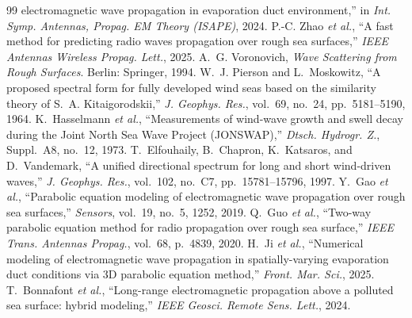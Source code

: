 \documentclass[11pt,a4paper]{article}
\begin{document}
\begin{thebibliography}{99}
  electromagnetic wave propagation in evaporation duct environment,'' in
  \emph{Int. Symp. Antennas, Propag. EM Theory (ISAPE)}, 2024.
 P.-C. Zhao \emph{et al.}, ``A fast method for predicting radio
  waves propagation over rough sea surfaces,'' \emph{IEEE Antennas Wireless Propag.
  Lett.}, 2025.
 A.~G. Voronovich, \emph{Wave Scattering from Rough
  Surfaces}. Berlin: Springer, 1994.
 W.~J. Pierson and L.~Moskowitz, ``A proposed spectral form for fully
  developed wind seas based on the similarity theory of S.~A. Kitaigorodskii,''
  \emph{J. Geophys. Res.}, vol.~69, no.~24, pp.~5181--5190, 1964.
 K.~Hasselmann \emph{et al.}, ``Measurements of wind-wave
  growth and swell decay during the Joint North Sea Wave Project (JONSWAP),''
  \emph{Dtsch. Hydrogr. Z.}, Suppl.~A8, no.~12, 1973.
 T.~Elfouhaily, B.~Chapron, K.~Katsaros, and
  D.~Vandemark, ``A unified directional spectrum for long and short wind-driven
  waves,'' \emph{J. Geophys. Res.}, vol.~102, no.~C7, pp.~15781--15796, 1997.
 Y.~Gao \emph{et al.}, ``Parabolic equation modeling of
  electromagnetic wave propagation over rough sea surfaces,'' \emph{Sensors},
  vol.~19, no.~5, 1252, 2019.
 Q.~Guo \emph{et al.}, ``Two-way parabolic equation method for radio
  propagation over rough sea surface,'' \emph{IEEE Trans. Antennas Propag.},
  vol.~68, p.~4839, 2020.
 H.~Ji \emph{et al.}, ``Numerical modeling of electromagnetic wave
  propagation in spatially-varying evaporation duct conditions via 3D parabolic
  equation method,'' \emph{Front. Mar. Sci.}, 2025.
 T.~Bonnafont \emph{et al.}, ``Long-range electromagnetic
  propagation above a polluted sea surface: hybrid modeling,'' \emph{IEEE Geosci.
  Remote Sens. Lett.}, 2024.
\end{thebibliography}
\end{document}
